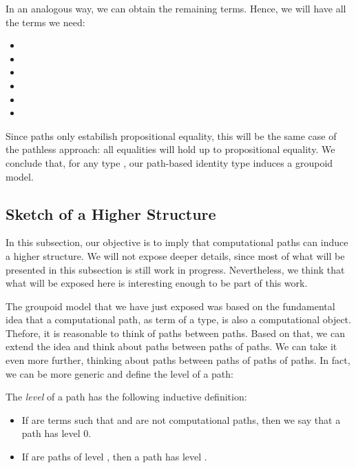 \documentclass{entcs} \usepackage{entcsmacro}
\begin{document}
In an analogous way, we can obtain the remaining terms. Hence, we will have all the terms we need:

\begin{itemize}

\item 
\item 
\item 
\item 
\item 
\item 
\end{itemize}

Since paths only estabilish propositional equality, this will be the same case of the pathless approach: all equalities will hold up to propositional equality. We conclude that, for any type , our path-based identity type induces a groupoid model.

\subsection{Sketch of a Higher Structure}

In this subsection, our objective is to imply that computational paths can induce a higher structure. We will not expose deeper details, since most of what will be presented in this subsection is still work in progress. Nevertheless, we think that what will be exposed here is interesting enough to be part of this work. 

The groupoid model that we have just exposed was based on the fundamental idea that a computational path, as term of a type, is also a computational object. Thefore, it is reasonable to think of paths between paths. Based on that, we can extend the idea and think about paths between paths of paths. We can take it even more further, thinking about paths between paths of paths of paths. In fact, we can be more generic and define the level of a path:

\begin{definition}

The \emph{level} of a path has the following inductive definition:

\begin{itemize}

\item If  are terms such that  and  are not computational paths, then we say that a path  has level 0.

\item If  are paths of level , then a path  has level .

\end{itemize}

\end{definition}
\end{document}
